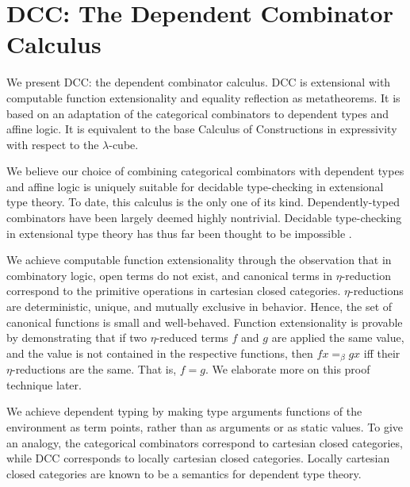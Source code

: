 \documentclass{article}
\begin{document}

\section{\label{dccintro}DCC: The Dependent Combinator Calculus}

We present DCC: the dependent combinator calculus. DCC is extensional with computable function extensionality and equality reflection as metatheorems. It is based on an adaptation of the categorical combinators to dependent types and affine logic. It is equivalent to the base Calculus of Constructions in expressivity with respect to the \(\lambda\)-cube.

We believe our choice of combining categorical combinators with dependent types and affine logic is uniquely suitable for decidable type-checking in extensional type theory. To date, this calculus is the only one of its kind. Dependently-typed combinators have been largely deemed highly nontrivial. Decidable type-checking in extensional type theory has thus far been thought to be impossible \autocite[2]{hofmann1995extensional}.

We achieve computable function extensionality through the observation that in combinatory logic, open terms do not exist, and canonical terms in \(\eta\)-reduction correspond to the primitive operations in cartesian closed categories. \(\eta\)-reductions are deterministic, unique, and mutually exclusive in behavior. Hence, the set of canonical functions is small and well-behaved. Function extensionality is provable by demonstrating that if two \(\eta\)-reduced terms \(f\) and \(g\) are applied the same value, and the value is not contained in the respective functions, then \(f x =_{\beta} g x\) iff their \(\eta\)-reductions are the same. That is, \(f = g\). We elaborate more on this proof technique later.

We achieve dependent typing by making type arguments functions of the environment as term points, rather than as arguments or as static values. To give an analogy, the categorical combinators correspond to cartesian closed categories, while DCC corresponds to locally cartesian closed categories. Locally cartesian closed categories are known to be a semantics for dependent type theory\autocite{Seely_1984}.
\end{document}
